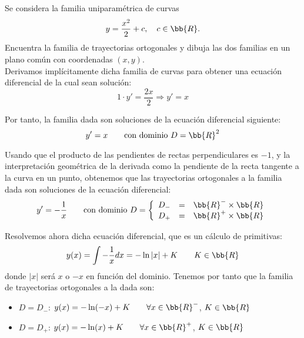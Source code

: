 \documentclass[12pt]{article}
\begin{document}
    \begin{ejercicio}
        Se considera la familia uniparamétrica de curvas
        \begin{equation*}
            y = \dfrac{x^2}{2} + c, \quad c \in \bb{R}.
        \end{equation*}
        Encuentra la familia de trayectorias ortogonales y dibuja las dos familias en un plano común con coordenadas $(x, y)$.\\

        Derivamos implícitamente dicha familia de curvas para obtener una ecuación diferencial de la cual sean solución:
        \begin{equation*}
            1\cdot y' = \dfrac{2x}{2}\Longrightarrow y'=x
        \end{equation*}

        Por tanto, la familia dada son soluciones de la ecuación diferencial siguiente:
        \begin{equation*}
            y'=x\qquad \text{con dominio}\ D=\bb{R}^2
        \end{equation*}

        Usando que el producto de las pendientes de rectas perpendiculares es $-1$, y la interpretación geométrica de la derivada como la pendiente de la recta tangente a la curva en un punto, obtenemos que las trayectorias ortogonales a la familia dada son soluciones de la ecuación diferencial:
        \begin{equation*}
            y'=-\dfrac{1}{x}\qquad \text{con dominio}\ D=\left\{
                \begin{array}{rcl}
                    D_{-} & = & \bb{R}^-\times \bb{R}\\
                    D_{+} & = & \bb{R}^+\times \bb{R}
                \end{array}
            \right.
        \end{equation*}

        Resolvemos ahora dicha ecuación diferencial, que es un cálculo de primitivas:
        \begin{equation*}
            y(x) = \int-\dfrac{1}{x}dx=-\ln|x|+K\qquad K\in\bb{R}
        \end{equation*}
        donde $|x|$ será $x$ o $-x$ en función del dominio. Tenemos por tanto que la familia de trayectorias ortogonales a la dada son:
        \begin{itemize}
            \item \ul{$D=D_{-}$}: $y(x)=-\ln(-x)+K\qquad \forall x\in \bb{R}^-$, $K\in\bb{R}$
            \item \ul{$D=D_{+}$}: $y(x)=-\ln(x)+K\qquad \forall x\in \bb{R}^+$, $K\in\bb{R}$
        \end{itemize}


\end{ejercicio}
\end{document}
